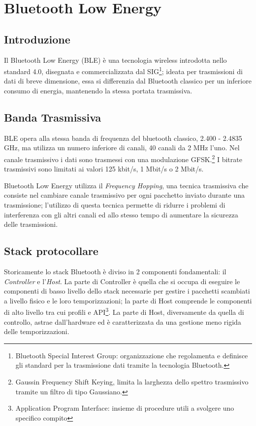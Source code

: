 
\section{Bluetooth Low Energy}
\subsection{Introduzione}
Il Bluetooth Low Energy (BLE) è una tecnologia wireless introdotta nello standard 4.0, disegnata e commercializzata dal SIG\footnote{Bluetooth Special Interest Group: organizzazione che regolamenta e definisce gli standard  per la trasmissione dati tramite la tecnologia Bluetooth.}; ideata per trasmissioni di dati di breve dimensione, essa si differenzia dal Bluetooth classico per un inferiore consumo di energia, mantenendo la stessa portata trasmissiva.

\subsection{Banda Trasmissiva}
BLE opera alla stessa banda di frequenza del bluetooth classico, 2.400 - 2.4835 GHz, ma utilizza un numero inferiore di canali, 40 canali da 2 MHz l'uno.
Nel canale trasmissivo i dati sono trasmessi con una modulazione GFSK.\footnote{Gaussin Frequency Shift Keying, limita la larghezza dello spettro trasmissivo tramite un filtro di tipo Gaussiano.}
I bitrate trasmissivi sono limitati ai valori 125 kbit/s, 1 Mbit/s o 2 Mbit/s.

Bluetooth Low Energy utilizza il \emph{Frequency Hopping}, una tecnica trasmissiva che consiste nel cambiare canale trasmissivo per ogni pacchetto inviato durante una trasmissione; l'utilizzo di questa tecnica permette di ridurre i problemi di interferenza con gli altri canali ed allo stesso tempo di aumentare la sicurezza delle trasmissioni.

\subsection{Stack protocollare}
Storicamente lo stack Bluetooth è diviso in 2 componenti fondamentali: il \emph{Controller} e l'\emph{Host}.
La parte di Controller è quella che si occupa di eseguire le componenti di basso livello dello stack necessarie per gestire i pacchetti scambiati a livello fisico e le loro temporizzazioni; la parte di Host comprende le componenti di alto livello tra cui profili e API\footnote{Application Program Interface: insieme di procedure utili a svolgere uno specifico compito}. La parte di Host, diversamente da quella di controllo, astrae dall'hardware ed è caratterizzata da una gestione meno rigida delle temporizzazioni.

